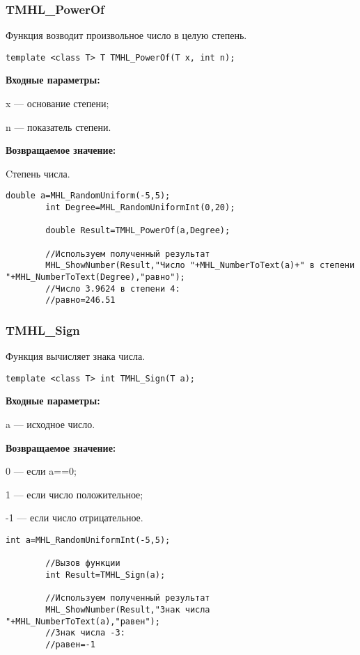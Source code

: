 \documentclass[a4paper,12pt]{article}
\begin{document}
\subsubsection{TMHL\_PowerOf}\label{TMHL_PowerOf}

Функция возводит произвольное число в целую степень.


\begin{lstlisting}[label=code_syntax_TMHL_PowerOf,caption=Синтаксис]
template <class T> T TMHL_PowerOf(T x, int n);
\end{lstlisting}

\textbf{Входные параметры:}  
 
x --- основание степени;
 
n --- показатель степени.

\textbf{Возвращаемое значение:}

Cтепень числа.


\begin{lstlisting}[label=code_use_TMHL_PowerOf,caption=Пример использования]
        double a=MHL_RandomUniform(-5,5);
        int Degree=MHL_RandomUniformInt(0,20);

        double Result=TMHL_PowerOf(a,Degree);

        //Используем полученный результат
        MHL_ShowNumber(Result,"Число "+MHL_NumberToText(a)+" в степени "+MHL_NumberToText(Degree),"равно");
        //Число 3.9624 в степени 4:
        //равно=246.51
\end{lstlisting}

\subsubsection{TMHL\_Sign}\label{TMHL_Sign}

Функция вычисляет знака числа.


\begin{lstlisting}[label=code_syntax_TMHL_Sign,caption=Синтаксис]
template <class T> int TMHL_Sign(T a);
\end{lstlisting}

\textbf{Входные параметры:}

 a --- исходное число.

\textbf{Возвращаемое значение:}

 0 --- если a==0;
 
 1 --- если число положительное;
 
 -1 --- если число отрицательное.


\begin{lstlisting}[label=code_use_TMHL_Sign,caption=Пример использования]
        int a=MHL_RandomUniformInt(-5,5);

        //Вызов функции
        int Result=TMHL_Sign(a);

        //Используем полученный результат
        MHL_ShowNumber(Result,"Знак числа "+MHL_NumberToText(a),"равен");
        //Знак числа -3:
        //равен=-1
\end{lstlisting}
\end{document}
